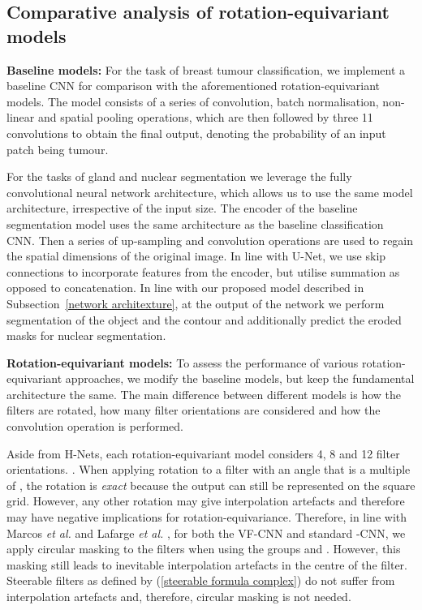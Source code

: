 \documentclass[journal]{IEEEtran}
\newcommand\mg[1]{{\color{black}{#1}}}
\begin{document}
	\subsection{Comparative analysis of rotation-equivariant models} \label{dup1 section:comparison_equiv}
	
    	\textbf{Baseline models: }For the task of breast tumour classification, we implement a baseline CNN for comparison with the aforementioned rotation-equivariant models. The model consists of a series of convolution, batch normalisation, non-linear and spatial pooling operations, which are then followed by three 11 convolutions to obtain the final output, denoting the probability of an input patch being tumour. 
    	
        For the tasks of gland and nuclear segmentation we leverage the fully convolutional neural network architecture, which allows us to use the same model architecture, irrespective of the input size. The encoder of the baseline segmentation model uses the same architecture as the baseline classification CNN. Then a series of up-sampling and convolution operations are used to regain the spatial dimensions of the original image. In line with U-Net, we use skip connections to incorporate features from the encoder, but utilise summation as opposed to concatenation. In line with our proposed model described in Subsection~\ref{network architexture}, at the output of the network we perform segmentation of the object and the contour and additionally predict the eroded masks for nuclear segmentation. 
        
    	\textbf{Rotation-equivariant models:}\label{re_models} To assess the performance of various rotation-equivariant approaches, we modify the baseline models, but keep the fundamental architecture the same. The main difference between different models is how the filters are rotated, how many filter orientations are considered and how the convolution operation is performed.
    	
    	Aside from H-Nets, each rotation-equivariant model considers 4, 8 and 12 filter orientations. \mg{H-Nets encode full 360 equivariance within the model and therefore filters do not need to be explicitly rotated}. When applying rotation to a filter with an angle that is a multiple of , the rotation is \textit{exact} because the output can still be represented on the square grid. However, any other rotation may give interpolation artefacts and therefore may have negative implications for rotation-equivariance. Therefore, in line with Marcos \textit{et al.} \cite{marcos2017rotation} and Lafarge \textit{et al.} \cite{lafarge2020roto}, for both the VF-CNN and standard -CNN, we apply circular masking to the filters when using the groups  and . However, this masking still leads to inevitable interpolation artefacts in the centre of the filter. Steerable filters as defined by (\ref{steerable formula complex}) do not suffer from interpolation artefacts and, therefore, circular masking is not needed. 
    	
\end{document}
